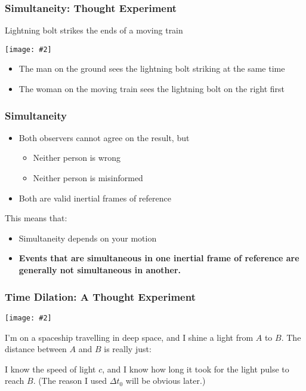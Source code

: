 \documentclass[12pt,compress,aspectratio=169]{beamer}
\newcommand{\pic}[2]{\texttt{[image: \#2]}}
\begin{document}
\begin{frame}
  \frametitle{Simultaneity: Thought Experiment}
  Lightning bolt strikes the ends of a moving train
  \begin{center}
    \pic{.58}{87-1-1024x673.png}
  \end{center}
  \vspace{-0.1in}
  \begin{itemize}
  \item The man on the ground sees the lightning bolt striking at the same time
  \item The woman on the moving train sees the lightning bolt on the right first
  \end{itemize}
\end{frame}


\begin{frame}
  \frametitle{Simultaneity}
  \begin{itemize}
  \item Both observers cannot agree on the result, but
    \begin{itemize}
    \item Neither person is wrong
    \item Neither person is misinformed
    \end{itemize}  \item Both are valid inertial frames of reference
  \end{itemize}
  This means that:
  \begin{itemize}
  \item Simultaneity depends on your motion
  \item\textbf{Events that are simultaneous in one inertial frame of reference
    are generally not simultaneous in another.}
  \end{itemize}
\end{frame}

\begin{frame}
  \frametitle{Time Dilation: A Thought Experiment}
  \begin{center}
    \pic{0.4}{light-a-b.png}
  \end{center}
  I'm on a spaceship travelling in deep space, and I shine a light from
  $A$ to $B$. The distance between $A$ and $B$ is really just:

  \vspace{-0.2in}{\LARGE
    \begin{displaymath}
      |AB|=c\Delta t_0
    \end{displaymath}
  }

  \vspace{-0.2in}
  I know the speed of light $c$, and I know how long it took for the light
  pulse to reach $B$. (The reason I used $\Delta t_0$ will be obvious later.)
\end{frame}
\end{document}
